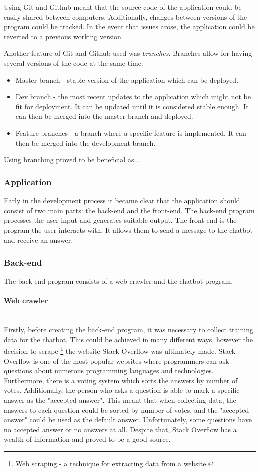\documentclass[12pt,a4paper]{article}
\newcommand{\myparagraph}[1]{\paragraph{#1}\mbox{}\\}
\begin{document}
Using Git and Github meant that the source code of the application could be easily shared between computers. Additionally, changes between versions of the program could be tracked. In the event that issues arose, the application could be reverted to a previous working version. 

Another feature of Git and Github used was \textit{branches}. Branches allow for having several versions of the code at the same time:
\begin{itemize}
    \item Master branch - stable version of the application which can be deployed.
    \item Dev branch - the most recent updates to the application which might not be fit for deployment. It can be updated until it is considered stable enough. It can then be merged into the master branch and deployed.
    \item Feature branches - a branch where a specific feature is implemented. It can then be merged into the development branch.
\end{itemize}

Using branching proved to be beneficial as... 

\subsubsection{Application}
Early in the development process it became clear that the application should consist of two main parts: the back-end and the front-end. The back-end program processes the user input and generates suitable output. The front-end is the program the user interacts with. It allows them to send a message to the chatbot and receive an answer.

\subsubsection{Back-end}
The back-end program consists of a web crawler and the chatbot program.

\myparagraph{Web crawler}
Firstly, before creating the back-end program, it was necessary to collect training data for the chatbot. This could be achieved in many different ways, however the decision to scrape \footnote{Web scraping - a technique for extracting data from a website.} the website Stack Overflow was ultimately made. Stack Overflow is one of the most popular websites where programmers can ask questions about numerous programming languages and technologies. Furthermore, there is a voting system which sorts the answers by number of votes. Additionally, the person who asks a question is able to mark a specific answer as the "accepted answer". This meant that when collecting data, the answers to each question could be sorted by number of votes, and the "accepted answer" could be used as the default answer. Unfortunately, some questions have no accepted answer or no answers at all. Despite that, Stack Overflow has a wealth of information and proved to be a good source.
\end{document}
